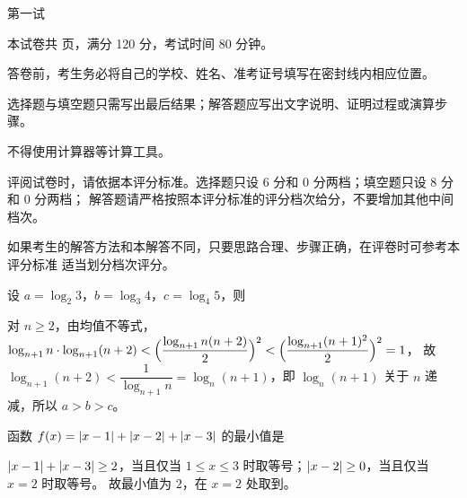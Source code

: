 \documentclass{mojing-exam}
\begin{document}
\begin{paper}[time={8:00—9:20}, full=120]{第一试}

\begin{instructions}
  \item 本试卷共 \papertotalpages{} 页，满分 120 分，考试时间 80 分钟。
  \item 答卷前，考生务必将自己的学校、姓名、准考证号填写在密封线内相应位置。
  \item 选择题与填空题只需写出最后结果；解答题应写出文字说明、证明过程或演算步骤。
  \item 不得使用计算器等计算工具。
\end{instructions}

\begin{gradingnotes}
  \item 评阅试卷时，请依据本评分标准。选择题只设 6 分和 0 分两档；填空题只设 8 分和 0 分两档；
        解答题请严格按照本评分标准的评分档次给分，不要增加其他中间档次。
  \item 如果考生的解答方法和本解答不同，只要思路合理、步骤正确，在评卷时可参考本评分标准
        适当划分档次评分。
\end{gradingnotes}



\begin{questions}
\question 设 $a=\log_2 3$，$b=\log_3 4$，$c=\log_4 5$，则 \paren[A]
\begin{solution}
对 $n\ge2$，由均值不等式，
$\log_{n+1}n\cdot\log_{n+1}(n+2)<\Bigl(\dfrac{\log_{n+1}n(n+2)}{2}\Bigr)^2<\Bigl(\dfrac{\log_{n+1}(n+1)^2}{2}\Bigr)^2=1$，
故 $\log_{n+1}(n+2)<\dfrac{1}{\log_{n+1}n}=\log_n(n+1)$，即 $\log_n(n+1)$ 关于 $n$ 递减，所以 $a>b>c$。
\end{solution}

\question 函数 $f(x)=\lvert x-1\rvert+\lvert x-2\rvert+\lvert x-3\rvert$ 的最小值是 \paren[C]
\begin{solution}
$\lvert x-1\rvert+\lvert x-3\rvert\ge2$，当且仅当 $1\le x\le3$ 时取等号；$\lvert x-2\rvert\ge0$，当且仅当 $x=2$ 时取等号。
故最小值为 $2$，在 $x=2$ 处取到。
\end{solution}


\end{questions}
\end{paper}
\end{document}
